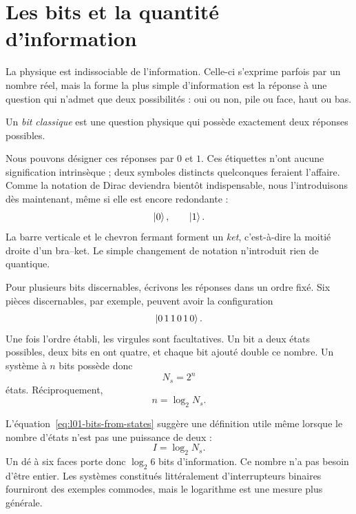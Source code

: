 \section{Les bits et la quantité d’information}

La physique est indissociable de l’information. Celle-ci s’exprime parfois par un nombre réel, mais la forme la plus simple d’information est la réponse à une question qui n’admet que deux possibilités : oui ou non, pile ou face, haut ou bas.

\begin{definition}Un \emph{bit classique} est une question physique qui possède exactement deux réponses possibles.\end{definition}

Nous pouvons désigner ces réponses par \(0\) et \(1\). Ces étiquettes n’ont aucune signification intrinsèque ; deux symboles distincts quelconques feraient l’affaire. Comme la notation de Dirac deviendra bientôt indispensable, nous l’introduisons dès maintenant, même si elle est encore redondante :
\begin{equation}
  \left\lvert0\right\rangle,
  \qquad
  \left\lvert1\right\rangle.
\end{equation}
La barre verticale et le chevron fermant forment un \emph{ket}, c’est-à-dire la moitié droite d’un bra--ket. Le simple changement de notation n’introduit rien de quantique.

Pour plusieurs bits discernables, écrivons les réponses dans un ordre fixé. Six pièces discernables, par exemple, peuvent avoir la configuration
\begin{equation}
  \left\lvert0\,1\,1\,0\,1\,0\right\rangle.
\end{equation}
Une fois l’ordre établi, les virgules sont facultatives. Un bit a deux états possibles, deux bits en ont quatre, et chaque bit ajouté double ce nombre. Un système à \(n\) bits possède donc
\begin{equation}
  N_s=2^n
  \label{eq:l01-state-count}
\end{equation}
états. Réciproquement,
\begin{equation}
  n=\log_2 N_s.
  \label{eq:l01-bits-from-states}
\end{equation}

L’équation~\eqref{eq:l01-bits-from-states} suggère une définition utile même lorsque le nombre d’états n’est pas une puissance de deux :
\begin{equation}
  I=\log_2 N_s.
  \label{eq:l01-information}
\end{equation}
Un dé à six faces porte donc \(\log_2 6\) bits d’information. Ce nombre n’a pas besoin d’être entier. Les systèmes constitués littéralement d’interrupteurs binaires fourniront des exemples commodes, mais le logarithme est une mesure plus générale.

